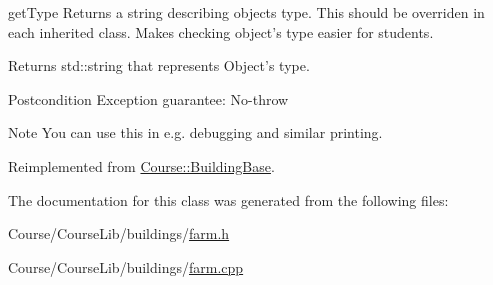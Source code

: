 get\-Type Returns a string describing objects type. This should be overriden in each inherited class. Makes checking object's type easier for students. 

\begin{DoxyReturn}{Returns}
std\-::string that represents Object's type. 
\end{DoxyReturn}
\begin{DoxyPostcond}{Postcondition}
Exception guarantee\-: No-\/throw 
\end{DoxyPostcond}
\begin{DoxyNote}{Note}
You can use this in e.\-g. debugging and similar printing. 
\end{DoxyNote}


Reimplemented from \hyperlink{classCourse_1_1BuildingBase_ac2cc44e08dc73d05b1617bf71295baaf}{Course\-::\-Building\-Base}.



The documentation for this class was generated from the following files\-:\begin{DoxyCompactItemize}
\item 
Course/\-Course\-Lib/buildings/\hyperlink{farm_8h}{farm.\-h}\item 
Course/\-Course\-Lib/buildings/\hyperlink{farm_8cpp}{farm.\-cpp}\end{DoxyCompactItemize}
